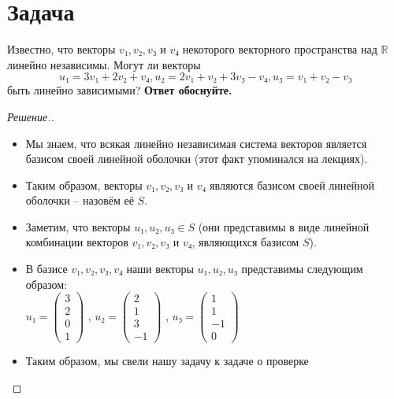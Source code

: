 \documentclass[a4paper]{article}
\theoremstyle{remark}
\begin{document}
    \section*{Задача }
      Известно, что векторы  $v₁, v₂, v₃$ и $v₄$ некоторого векторного
      пространства над $\mathbb{R}$ линейно независимы. Могут ли
      векторы \\
      \[u₁ = 3v₁ + 2v₂ + v₄, u₂ = 2v₁ + v₂ + 3v₃ - v₄,
       u₃ = v₁ + v₂ - v₃ \] 
       быть линейно зависимыми? \textbf{Ответ обоснуйте.}
      \begin{proof}[Решение.] \ 
        \begin{itemize}
            \item  Мы знаем, что всякая линейно независимая система векторов
            является базисом своей линейной оболочки (этот факт упоминался
            на лекциях).
            \item Таким образом, векторы $v₁, v₂, v₃$ и $v₄$ являются
            базисом своей линейной оболочки -- назовём её $S$. 
            \item Заметим, что векторы $u₁, u₂, u₃ ∈ S$ (они представимы
            в виде линейной комбинации векторов $v₁, v₂, v₃$ и $v₄$, являющихся
            базисом $S$). 
            \item В базисе $v₁, v₂, v₃, v₄$ наши векторы $u₁, u₂, u₃$ 
            представимы следующим образом: \\
            $u₁ = \begin{pmatrix}
              3 \\
              2 \\ 
              0 \\ 
              1 
            \end{pmatrix}$ ,
            $u₂ = \begin{pmatrix}
              2 \\
              1 \\ 
              3 \\ 
              -1 
            \end{pmatrix}$ ,
            $u₃ = \begin{pmatrix}
              1 \\
              1 \\ 
              -1 \\ 
              0 
            \end{pmatrix}$
            \item Таким образом, мы свели нашу задачу к задаче о проверке 

\end{itemize}
\end{proof}
\end{document}
